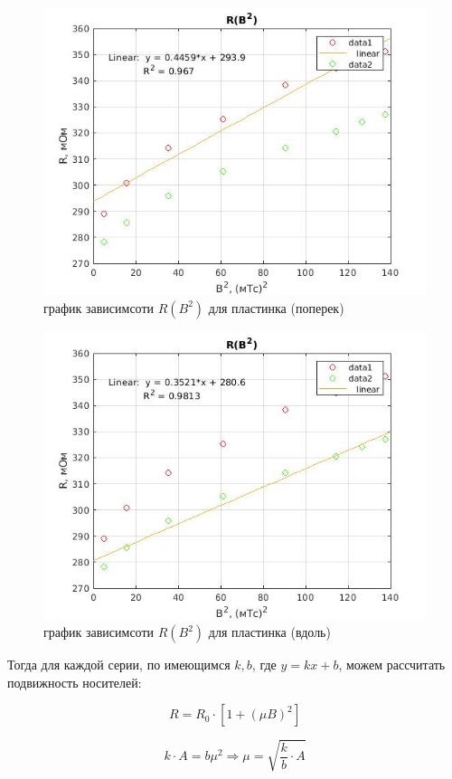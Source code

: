 \documentclass[a4paper, 12pt]{article}%
\begin{document}
\begin{center}
\begin{figure}[!h]
    \centering
    \includegraphics[width = 10 cm]{graph2(no_disk_poperek).jpg}
    \caption{график зависимсоти $R(B^2)$ для пластинка (поперек)}
    \label{ser2}
\end{figure}
\end{center}


\begin{center}
\begin{figure}[!h]
    \centering
    \includegraphics[width = 10 cm]{graph2(no_disk_vdol).jpg}
    \caption{график зависимсоти $R(B^2)$ для пластинка (вдоль)}
    \label{ser3}
\end{figure}
\end{center}

Тогда для каждой серии, по имеющимся $k,b$, где $y = kx + b$, можем рассчитать подвижность носителей:

\[ R = R_0\cdot\left[1 + (\mu B)^2\right]\]

\[ k \cdot A = b\mu^2 \Rightarrow \mu = \sqrt{\frac{k}{b} \cdot A} \]
\end{document}
